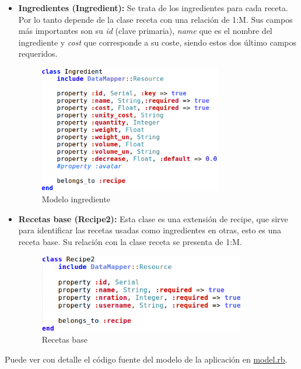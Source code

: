 \begin{itemize}
	\item \textbf{Ingredientes (Ingredient):} Se trata de los ingredientes para cada receta. Por lo tanto depende de la clase receta con una relación de 1:M. Sus campos más importantes son su \emph{id} (clave primaria), \emph{name} que es el nombre del ingrediente y \emph{cost} que corresponde a su coste, siendo estos dos último campos requeridos.

	\begin{figure}[H]
		\centering
		\includegraphics[width=8cm]{./images/chefmanagement-model-ingredient.png}
		\caption{Modelo ingrediente} \label{fig:chefmanagement-model-inredient}
	\end{figure}

	\item \textbf{Recetas base (Recipe2):} Esta clase es una extensión de recipe, que sirve para identificar las recetas usadas como ingredientes en otras, esto es una receta base. Su relación con la clase receta se presenta de 1:M.

	\begin{figure}[H]
		\centering
		\includegraphics[width=9cm]{./images/chefmanagement-model-recipe2.png}
		\caption{Recetas base} \label{fig:chefmanagement-model-recipe2}
	\end{figure}

\end{itemize}

Puede ver con detalle el código fuente del modelo de la aplicación en \href{https://github.com/alu0100207385/ChefManagement/blob/master/app/models/model.rb}{model.rb}.

%
